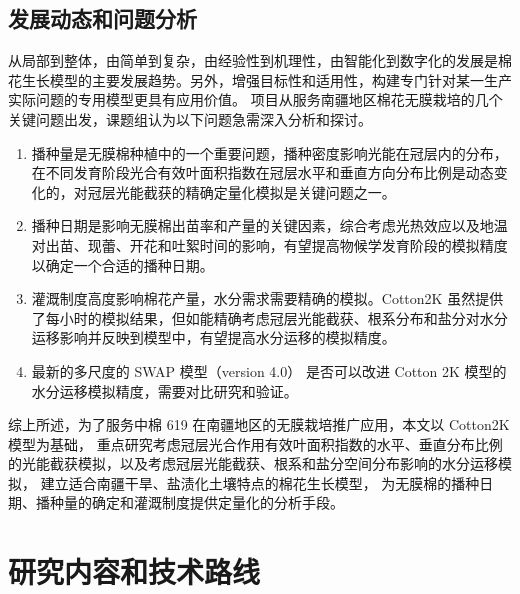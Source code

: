 \subsection{发展动态和问题分析}
从局部到整体，由简单到复杂，由经验性到机理性，由智能化到数字化的发展是棉花生长模型的主要发展趋势。另外，增强目标性和适用性，构建专门针对某一生产实际问题的专用模型更具有应用价值\cite{thorp2014}。
项目从服务南疆地区棉花无膜栽培的几个关键问题出发，课题组认为以下问题急需深入分析和探讨。

\begin{enumerate}
    \item 播种量是无膜棉种植中的一个重要问题，播种密度影响光能在冠层内的分布，在不同发育阶段光合有效叶面积指数在冠层水平和垂直方向分布比例是动态变化的，对冠层光能截获的精确定量化模拟是关键问题之一。
    \item 播种日期是影响无膜棉出苗率和产量的关键因素，综合考虑光热效应以及地温对出苗、现蕾、开花和吐絮时间的影响，有望提高物候学发育阶段的模拟精度以确定一个合适的播种日期。
    \item 灌溉制度高度影响棉花产量，水分需求需要精确的模拟。Cotton2K 虽然提供了每小时的模拟结果，但如能精确考虑冠层光能截获、根系分布和盐分对水分运移影响并反映到模型中，有望提高水分运移的模拟精度。
    \item 最新的多尺度的 SWAP 模型（version 4.0）\cite{swap2021} 是否可以改进 Cotton 2K 模型的水分运移模拟精度，需要对比研究和验证。
\end{enumerate}

综上所述，为了服务中棉 619 在南疆地区的无膜栽培推广应用，本文以 Cotton2K 模型为基础，
重点研究考虑冠层光合作用有效叶面积指数的水平、垂直分布比例的光能截获模拟，以及考虑冠层光能截获、根系和盐分空间分布影响的水分运移模拟，
建立适合南疆干旱、盐渍化土壤特点的棉花生长模型，
为无膜棉的播种日期、播种量的确定和灌溉制度提供定量化的分析手段。

\section{研究内容和技术路线}

